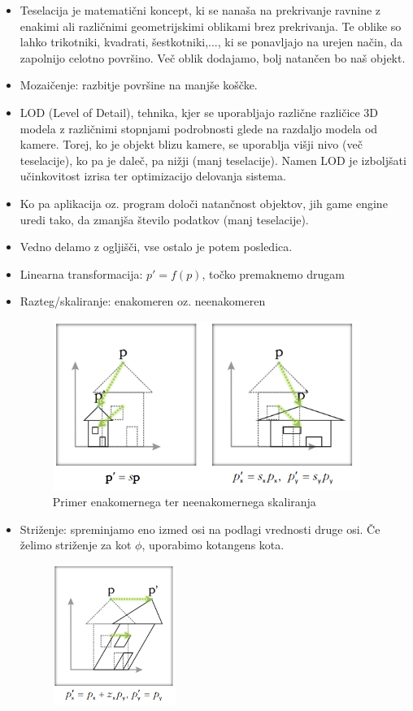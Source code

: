 \documentclass{article}
\begin{document}
\begin{itemize}
    \item Teselacija je matematični koncept, ki se nanaša na prekrivanje ravnine z enakimi ali različnimi geometrijskimi oblikami brez prekrivanja. Te oblike so lahko trikotniki, kvadrati, šestkotniki,..., ki se ponavljajo na urejen način, da zapolnijo celotno površino. Več oblik dodajamo, bolj natančen bo naš objekt. 
    \item Mozaičenje: razbitje površine na manjše koščke.
    \item LOD (Level of Detail), tehnika, kjer se uporabljajo različne različice 3D modela z različnimi stopnjami podrobnosti glede na razdaljo modela od kamere. Torej, ko je objekt blizu kamere, se uporablja višji nivo (več teselacije), ko pa je daleč, pa nižji (manj teselacije). Namen LOD je izboljšati učinkovitost izrisa ter optimizacijo delovanja sistema. 
    \item Ko pa aplikacija oz. program določi natančnost objektov, jih game engine uredi tako, da zmanjša število podatkov (manj teselacije).
    \item Vedno delamo z ogljišči, vse ostalo je potem posledica.
    \item Linearna transformacija: $p' = f(p)$, točko premaknemo drugam
    \item Razteg/skaliranje: enakomeren oz. neenakomeren
    \begin{figure}[H]
    \centering
    \includegraphics[width=100mm]{src/razteg_skaliranje.png}
    \caption{Primer enakomernega ter neenakomernega skaliranja}
    \end{figure}
    \item Striženje: spreminjamo eno izmed osi  na podlagi vrednosti druge osi. Če želimo striženje za kot $\phi$, uporabimo kotangens kota.
    \begin{figure}[H]
    \centering
    \includegraphics[width=40mm]{src/strizenje.png}

\end{figure}
\end{itemize}
\end{document}
